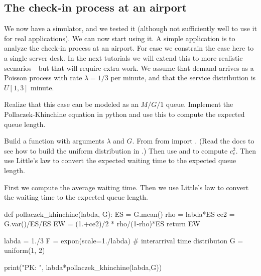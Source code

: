 \subsection{The check-in process at an airport}
\label{sec:check-in-process-at}

We now have a simulator, and we tested it (although not sufficiently well to use it for real applications).
We can now start using it.
A simple application is to analyze the check-in process at an airport.
For ease we constrain the case here to a single server desk.
In the next tutorials we will extend this to more realistic scenarios---but that will require extra work.
We assume that demand arrives as a Poisson process with rate $\lambda=1/3$ per minute, and that the service distribution is $U[1,3]$ minute.


\begin{exercise}\label{ex:5}
  Realize that this case can be modeled as an $M/G/1$ queue.
  Implement the Pollaczek-Khinchine equation in python and use this to compute the expected queue length.

  
  \begin{hint}
Build a function with arguments $\lambda$ and $G$. From from  import . (Read the docs to see how to build the uniform distribution in .) Then use  and  to compute $c_e^2$.  Then use Little's law to convert the expected waiting time to the expected queue length. 
  \end{hint}
  \begin{solution}

First we compute the average waiting time.  Then we use Little's law to convert the waiting time to the expected queue length.

    \begin{pyverbatim}

def pollaczek_khinchine(labda, G):
    ES = G.mean()
    rho = labda*ES
    ce2 = G.var()/ES/ES
    EW = (1.+ce2)/2 * rho/(1-rho)*ES
    return EW

    
labda = 1./3
F = expon(scale=1./labda)  # interarrival time distributon
G = uniform(1, 2)

print("PK: ", labda*pollaczek_khinchine(labda,G))
      
    \end{pyverbatim}

  \end{solution}

\end{exercise}

